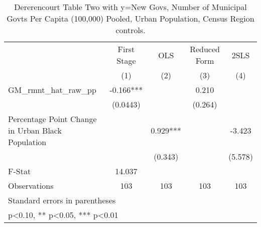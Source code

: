 \begin{table}[htbp]\centering
\def\sym#1{\ifmmode^{#1}\else\(^{#1}\)\fi}
\caption{Dererencourt Table Two with y=New Govs, Number of Municipal Govts Per Capita (100,000) Pooled, Urban Population, Census Region controls.}
\begin{tabular}{l*{4}{c}}
\toprule
                    & First Stage   &         OLS   &Reduced Form   &        2SLS   \\
                    &\multicolumn{1}{c}{(1)}   &\multicolumn{1}{c}{(2)}   &\multicolumn{1}{c}{(3)}   &\multicolumn{1}{c}{(4)}   \\
\midrule
GM\_rmnt\_hat\_raw\_pp  &      -0.166***&               &       0.210   &               \\
                    &    (0.0443)   &               &     (0.264)   &               \\
\addlinespace
Percentage Point Change in Urban Black Population&               &       0.929***&               &      -3.423   \\
                    &               &     (0.343)   &               &     (5.578)   \\
\midrule
F-Stat              &      14.037   &               &               &               \\
Observations        &         103   &         103   &         103   &         103   \\
\bottomrule
\multicolumn{5}{l}{\footnotesize Standard errors in parentheses}\\
\multicolumn{5}{l}{\footnotesize * p<0.10, ** p<0.05, *** p<0.01}\\
\end{tabular}
\end{table}
